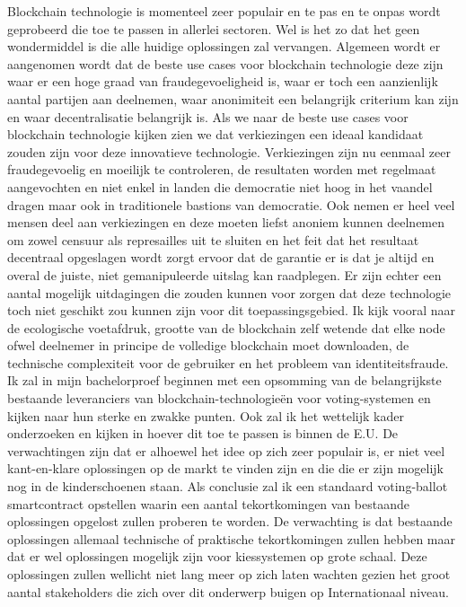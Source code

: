 Blockchain technologie is momenteel zeer populair en te pas en te onpas wordt geprobeerd die toe te passen in allerlei sectoren. Wel is het zo dat het geen wondermiddel is die alle huidige oplossingen zal vervangen. Algemeen wordt er aangenomen wordt dat de beste use cases voor blockchain technologie deze zijn waar er een hoge graad van fraudegevoeligheid is, waar er toch een aanzienlijk aantal partijen aan deelnemen, waar anonimiteit een belangrijk criterium kan zijn en waar decentralisatie belangrijk is.
Als we naar de beste use cases voor blockchain technologie kijken zien we dat verkiezingen een ideaal kandidaat zouden zijn voor deze innovatieve technologie. Verkiezingen zijn nu eenmaal zeer fraudegevoelig en moeilijk te controleren, de resultaten worden met regelmaat aangevochten en niet enkel in landen die democratie niet hoog in het vaandel dragen maar ook in traditionele bastions van democratie. Ook nemen er heel veel mensen deel aan verkiezingen en deze moeten liefst anoniem kunnen deelnemen om zowel censuur als represailles uit te sluiten en het feit dat het resultaat decentraal opgeslagen wordt zorgt ervoor dat de garantie er is dat je altijd en overal de juiste, niet gemanipuleerde uitslag kan raadplegen.
Er zijn echter een aantal mogelijk uitdagingen die zouden kunnen voor zorgen dat deze technologie toch niet geschikt zou kunnen zijn voor dit toepassingsgebied. Ik kijk vooral naar de ecologische voetafdruk, grootte van de blockchain zelf wetende dat elke node ofwel deelnemer in principe de volledige blockchain moet downloaden, de technische complexiteit voor de gebruiker en het probleem van identiteitsfraude.
Ik zal in mijn bachelorproef beginnen met een opsomming van de belangrijkste bestaande leveranciers van blockchain-technologieën voor voting-systemen en kijken naar hun sterke en zwakke punten.
Ook zal ik het wettelijk kader onderzoeken en kijken in hoever dit toe te passen is binnen de E.U.
De verwachtingen zijn dat er alhoewel het idee op zich zeer populair is, er niet veel kant-en-klare oplossingen op de markt te vinden zijn en die die er zijn mogelijk nog in de kinderschoenen staan.
Als conclusie zal ik een standaard voting-ballot smartcontract opstellen waarin een aantal tekortkomingen van bestaande oplossingen opgelost zullen proberen te worden. De verwachting is dat bestaande oplossingen allemaal technische of praktische tekortkomingen zullen hebben maar dat er wel oplossingen mogelijk zijn voor kiessystemen op grote schaal. Deze oplossingen zullen wellicht niet lang meer op zich laten wachten gezien het groot aantal stakeholders die zich over dit onderwerp buigen op Internationaal niveau.